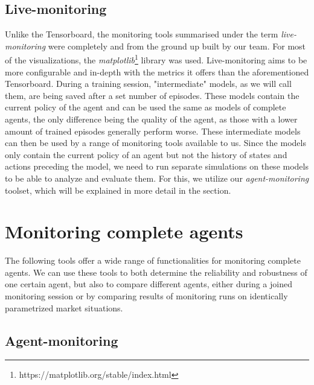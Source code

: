 \subsection{Live-monitoring}

Unlike the Tensorboard, the monitoring tools summarised under the term \emph{live-monitoring} were completely and from the ground up built by our team. For most of the visualizations, the \emph{matplotlib}\footnote[0][-0.2]{https://matplotlib.org/stable/index.html} library was used. Live-monitoring aims to be more configurable and in-depth with the metrics it offers than the aforementioned Tensorboard.  During a training session, "intermediate" models, as we will call them, are being saved after a set number of episodes.  These models contain the current policy of the agent and can be used the same as models of complete agents, the only difference being the quality of the agent, as those with a lower amount of trained episodes generally perform worse.  These intermediate models can then be used by a range of monitoring tools available to us. Since the models only contain the current policy of an agent but not the history of states and actions preceding the model, we need to run separate simulations on these models to be able to analyze and evaluate them. For this, we utilize our \emph{agent-monitoring} toolset, which will be explained in more detail in the  section.

\section{Monitoring complete agents}

The following tools offer a wide range of functionalities for monitoring complete agents. We can use these tools to both determine the reliability and robustness of one certain agent, but also to compare different agents, either during a joined monitoring session or by comparing results of monitoring runs on identically parametrized market situations.

\subsection{Agent-monitoring} \label{subsec:AgentMonitoring}

